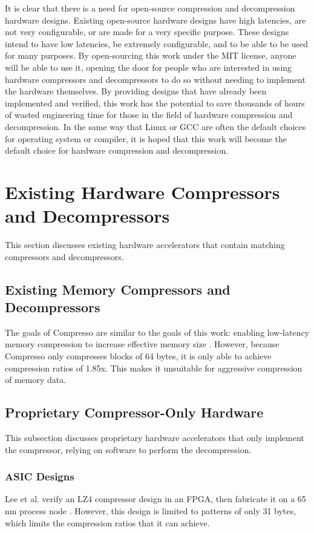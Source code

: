 \documentclass[doublespace,nopageskip]{VTthesis}
\begin{document}
It is clear that there is a need for open-source compression and decompression hardware designs. Existing open-source hardware designs have high latencies, are not very configurable, or are made for a very specific purpose. These designs intend to have low latencies, be extremely configurable, and to be able to be used for many purposes. By open-sourcing this work under the MIT license, anyone will be able to  use it, opening the door for people who are interested in using hardware compressors and decompressors to do so without needing to implement the hardware themselves. By providing designs that have already been implemented and verified, this work has the potential to save thousands of hours of wasted engineering time for those in the field of hardware compression and decompression. In the same way that Linux or GCC are often the default choices for operating system or compiler, it is hoped that this work will become the default choice for hardware compression and decompression.

\section{Existing Hardware Compressors and Decompressors}\label{se:existing_hardware_compressors_and_decompressors}
This section discusses existing hardware accelerators that contain matching compressors and decompressors.

\subsection{Existing Memory Compressors and Decompressors}\label{ss:other_memory_compressors_and_decompressors}
The goals of Compresso are similar to the goals of this work: enabling low-latency memory compression to increase effective memory size \cite{compresso}. However, because Compresso only compresses blocks of 64 bytes, it is only able to achieve compression ratios of 1.85x. This makes it unsuitable for aggressive compression of memory data.

\subsection{Proprietary Compressor-Only Hardware}\label{proprietary_compressor-only_hardware}
This subsection discusses proprietary hardware accelerators that only implement the compressor, relying on software to perform the decompression.

\subsubsection{ASIC Designs}\label{sss:asic_compressor_designs}
Lee et al. verify an LZ4 compressor design in an FPGA, then fabricate it on a 65 nm process node \cite{hardwarelz4}. However, this design is limited to patterns of only 31 bytes, which limits the compression ratios that it can achieve.
\end{document}

